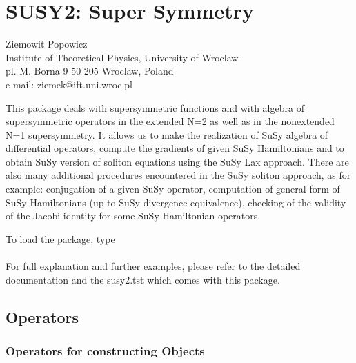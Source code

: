 \chapter{SUSY2: Super Symmetry}
\label{SUSY2}

{\footnotesize
\begin{center}
Ziemowit Popowicz \\
Institute of Theoretical Physics, University of Wroclaw\\
pl. M. Borna 9 50-205 Wroclaw, Poland \\
e-mail: ziemek@ift.uni.wroc.pl
\end{center}
}


This package deals with supersymmetric functions and with algebra
of supersymmetric operators in the extended N=2 as well as in the
nonextended N=1 supersymmetry. It allows us
to make the realization of SuSy algebra of differential operators,
compute the gradients of given SuSy Hamiltonians and to obtain
SuSy version of soliton equations using the SuSy Lax approach. There
are also many additional procedures encountered in the SuSy soliton
approach, as for example: conjugation of a given SuSy operator, computation
of general form of SuSy Hamiltonians (up to SuSy-divergence equivalence),
checking of the validity of the Jacobi identity for some SuSy
Hamiltonian operators.

To load the package, type  \\
\\
For full explanation and further examples, please refer to the 
detailed documentation and the susy2.tst which comes with this package.

\section{Operators}

\subsection{Operators for constructing Objects}

